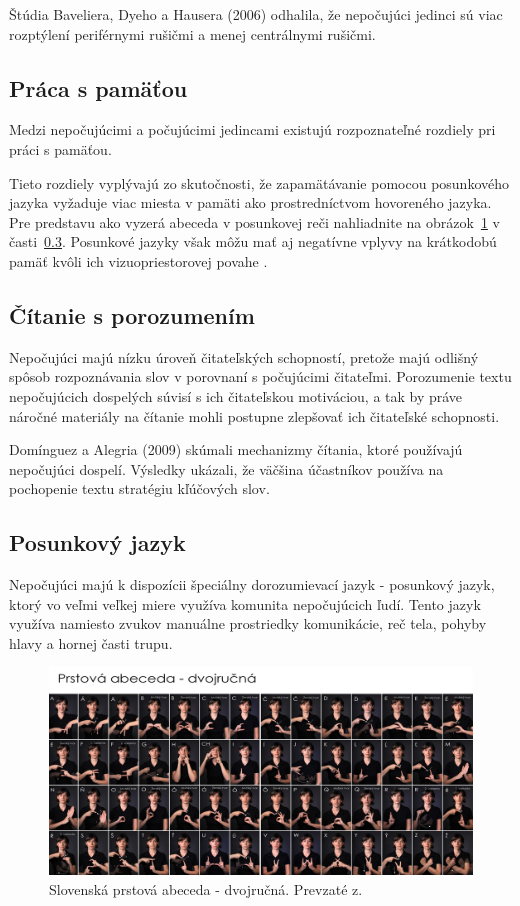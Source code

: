 \documentclass[10pt,oneside,slovak,a4paper]{article}
\begin{document}
Štúdia Baveliera, Dyeho a Hausera (2006) odhalila, že nepočujúci jedinci sú viac rozptýlení periférnymi rušičmi a menej centrálnymi rušičmi. \cite{bavelier2006deaf} 

\subsection{Práca s pamäťou} \label{rozdiely:pamat}
Medzi nepočujúcimi a počujúcimi jedincami existujú rozpoznateľné rozdiely pri práci s pamäťou. 

Tieto rozdiely vyplývajú zo skutočnosti, že zapamätávanie pomocou posunkového jazyka vyžaduje viac miesta v pamäti ako prostredníctvom hovoreného jazyka. Pre predstavu ako vyzerá abeceda v posunkovej reči nahliadnite na obrázok~\ref{slovenskaposunkovarec} v časti~\ref{rozdiely:posunkovyjazyk}. Posunkové jazyky však môžu mať aj negatívne vplyvy na krátkodobú pamäť kvôli ich vizuopriestorovej povahe
\cite{pappas2018learning}.

\subsection{Čítanie s porozumením} \label{rozdiely:citanie}
Nepočujúci majú nízku úroveň čitateľských schopností, pretože majú odlišný spôsob rozpoznávania slov v porovnaní s počujúcimi čitateľmi. Porozumenie textu nepočujúcich dospelých súvisí s ich čitateľskou motiváciou, a tak by práve náročné materiály na čítanie mohli postupne zlepšovať ich čitateľské schopnosti\cite{pappas2018learning}.

Domínguez a Alegria (2009) skúmali mechanizmy čítania, ktoré používajú nepočujúci dospelí. Výsledky ukázali, že väčšina účastníkov používa na pochopenie textu stratégiu kľúčových slov\cite{dominguez2010reading}. 

\subsection{Posunkový jazyk}
\label{rozdiely:posunkovyjazyk}
Nepočujúci majú k dispozícii špeciálny dorozumievací jazyk - posunkový jazyk, ktorý vo veľmi veľkej miere využíva komunita nepočujúcich ľudí. Tento jazyk využíva namiesto zvukov manuálne prostriedky komunikácie, reč tela, pohyby hlavy a hornej časti trupu.
\begin{figure}[H]
   \includegraphics[scale=0.15]{dvojrucnaabeceda.jpg}
\centering
\caption{Slovenská prstová abeceda - dvojručná. Prevzaté z\cite{mytyafakty}.}

\label{slovenskaposunkovarec}
\end{figure}
\end{document}
